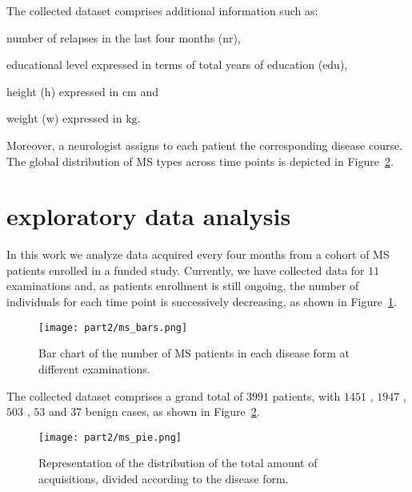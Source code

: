The collected \PCO dataset comprises additional information such as:
\begin{enumerate*}[label=\roman*)]
	\item number of relapses in the last four months ({\sc nr}),
	\item educational level expressed in terms of total years of education ({\sc edu}),
	\item height ({\sc h}) expressed in $\text{cm}$ and
	\item weight ({\sc w}) expressed in $\text{kg}$.
\end{enumerate*}
Moreover, a neurologist assigns to each patient the corresponding disease course. The global distribution of MS types across time points is depicted in Figure~\ref{fig:PPRRSP}.


\section{\PCOs exploratory data analysis} \label{sec:aism_eda}


In this work we analyze \PCOs data acquired every four months from a cohort of MS patients enrolled in a funded study.
Currently, we have collected data for $11$ examinations and, as patients enrollment is still ongoing,  the number of individuals for each time point is successively decreasing, as shown in Figure~\ref{fig:patients}.
\begin{figure}[]
	\centering
	\texttt{[image: part2/ms\_bars.png]}
	\caption{Bar chart of the number of MS patients in each disease form  at different examinations.} \label{fig:patients}
\end{figure}

The collected dataset comprises a grand total of $3991$ patients, with $1451$ \RR, $1947$ \SP, $503$ \PP, $53$ \PR and $37$ benign cases, as shown in Figure~\ref{fig:PPRRSP}.
\begin{figure}[]
	\centering
	\texttt{[image: part2/ms\_pie.png]}
	\caption{Representation of the distribution of the total amount of acquisitions, divided according to the disease form.} \label{fig:PPRRSP}
\end{figure}

